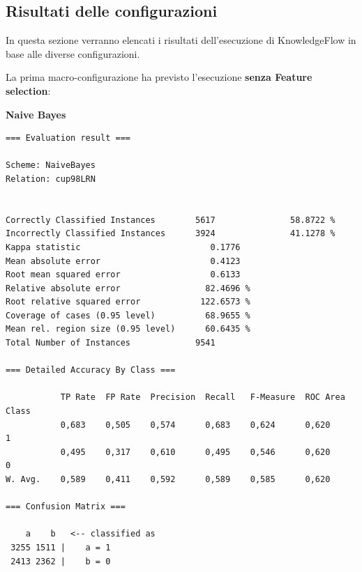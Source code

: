 


\subsection{Risultati delle configurazioni}
In questa sezione verranno elencati i risultati dell'esecuzione di KnowledgeFlow in base alle diverse configurazioni. \newline

La prima macro-configurazione ha previsto l'esecuzione \textbf{senza Feature selection}: \newline

\raggedright
\textbf{\Large Naive Bayes}

\begin{verbatim}
=== Evaluation result ===

Scheme: NaiveBayes
Relation: cup98LRN


Correctly Classified Instances        5617               58.8722 %
Incorrectly Classified Instances      3924               41.1278 %
Kappa statistic                          0.1776
Mean absolute error                      0.4123
Root mean squared error                  0.6133
Relative absolute error                 82.4696 %
Root relative squared error            122.6573 %
Coverage of cases (0.95 level)          68.9655 %
Mean rel. region size (0.95 level)      60.6435 %
Total Number of Instances             9541     

=== Detailed Accuracy By Class ===

           TP Rate  FP Rate  Precision  Recall   F-Measure  ROC Area  Class
           0,683    0,505    0,574      0,683    0,624      0,620     1
           0,495    0,317    0,610      0,495    0,546      0,620     0
W. Avg.    0,589    0,411    0,592      0,589    0,585      0,620          

=== Confusion Matrix ===

    a    b   <-- classified as
 3255 1511 |    a = 1
 2413 2362 |    b = 0
\end{verbatim}

